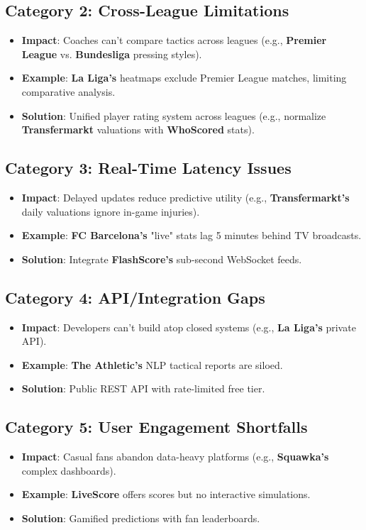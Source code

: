 \subsection{Category 2: Cross-League Limitations}
\begin{itemize}
\item \textbf{Impact}: Coaches can’t compare tactics across leagues (e.g., \textbf{Premier League} vs. \textbf{Bundesliga} pressing styles).
\item \textbf{Example}: \textbf{La Liga’s} heatmaps exclude Premier League matches, limiting comparative analysis.
\item \textbf{Solution}: Unified player rating system across leagues (e.g., normalize \textbf{Transfermarkt} valuations with \textbf{WhoScored} stats).
\end{itemize}

\subsection{Category 3: Real-Time Latency Issues}
\begin{itemize}
\item \textbf{Impact}: Delayed updates reduce predictive utility (e.g., \textbf{Transfermarkt’s} daily valuations ignore in-game injuries).
\item \textbf{Example}: \textbf{FC Barcelona’s} "live" stats lag 5 minutes behind TV broadcasts.
\item \textbf{Solution}: Integrate \textbf{FlashScore’s} sub-second WebSocket feeds.
\end{itemize}

\subsection{Category 4: API/Integration Gaps}
\begin{itemize}
\item \textbf{Impact}: Developers can’t build atop closed systems (e.g., \textbf{La Liga’s} private API).
\item \textbf{Example}: \textbf{The Athletic’s} NLP tactical reports are siloed.
\item \textbf{Solution}: Public REST API with rate-limited free tier.
\end{itemize}

\subsection{Category 5: User Engagement Shortfalls}
\begin{itemize}
\item \textbf{Impact}: Casual fans abandon data-heavy platforms (e.g., \textbf{Squawka’s} complex dashboards).
\item \textbf{Example}: \textbf{LiveScore} offers scores but no interactive simulations.
\item \textbf{Solution}: Gamified predictions with fan leaderboards.
\end{itemize}
